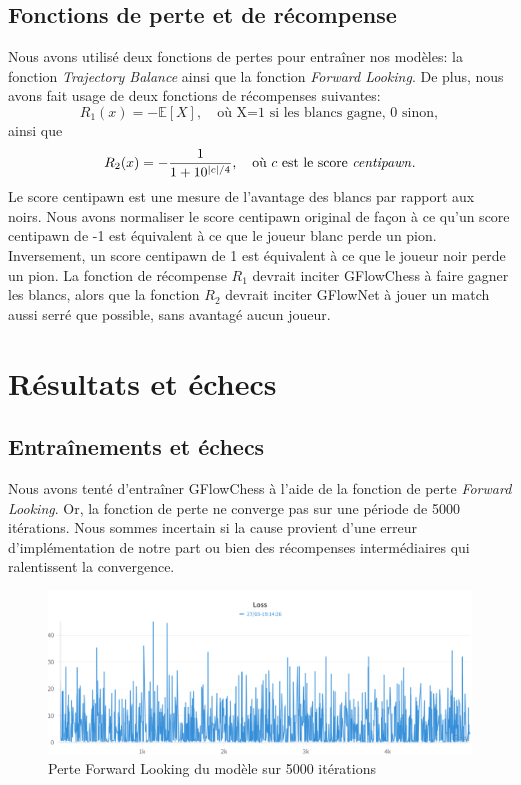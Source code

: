 \documentclass[11pt]{article}
\begin{document}
\subsection*{Fonctions de perte et de récompense}
Nous avons utilisé deux fonctions de pertes pour entraîner nos
modèles: la fonction \textit{Trajectory Balance} ainsi que la fonction
\textit{Forward Looking}. De plus, nous avons fait usage de deux
fonctions de récompenses suivantes:
\begin{equation*}
  R_{1}(x) = - \mathbb{E}[X], \quad \text{où X=1 si les blancs gagne, 0 sinon},
\end{equation*} ainsi que
\begin{equation*}
  R_{2}(x) = - \frac{1}{1+10^{|c|/4}}, \quad \text{où $c$ est le score \textit{centipawn}}.
\end{equation*}Le score centipawn est une mesure de l'avantage des
blancs par rapport aux noirs. Nous avons normaliser le score centipawn
original de façon à ce qu'un score centipawn de -1 est équivalent à ce
que le joueur blanc perde un pion. Inversement, un score centipawn de
1 est équivalent à ce que le joueur noir perde un pion. La fonction de
récompense $R_{1}$ devrait inciter GFlowChess à faire gagner les
blancs, alors que la fonction $R_{2}$ devrait inciter GFlowNet à jouer
un match aussi serré que possible, sans avantagé aucun joueur.

\section*{Résultats et échecs}
\subsection*{Entraînements et échecs}
Nous avons tenté d'entraîner GFlowChess à l'aide de la fonction de
perte \textit{Forward Looking}. Or, la fonction de perte ne converge
pas sur une période de 5000 itérations.  Nous sommes incertain si la
cause provient d'une erreur d'implémentation de notre part ou bien des
récompenses intermédiaires qui ralentissent la convergence.
\begin{figure}[H]
  \centering \includegraphics[scale=0.15]{fwloss.png}
  \caption{Perte Forward Looking du modèle sur 5000 itérations}
	\label{fig:fwloss}
\end{figure}
\end{document}
